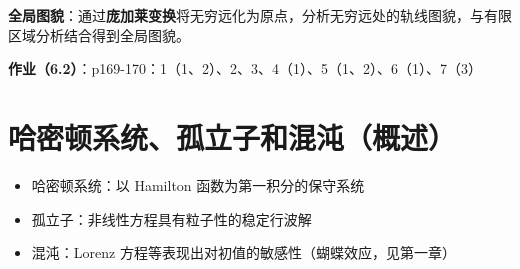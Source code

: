 \textbf{全局图貌}：通过\textbf{庞加莱变换}将无穷远化为原点，分析无穷远处的轨线图貌，与有限区域分析结合得到全局图貌。

\textbf{作业（6.2）}：p169-170：1（1、2）、2、3、4（1）、5（1、2）、6（1）、7（3）

\section{哈密顿系统、孤立子和混沌（概述）}

\begin{itemize}
    \item 哈密顿系统：以 Hamilton 函数为第一积分的保守系统
    \item 孤立子：非线性方程具有粒子性的稳定行波解
    \item 混沌：Lorenz 方程等表现出对初值的敏感性（蝴蝶效应，见第一章）
\end{itemize}
